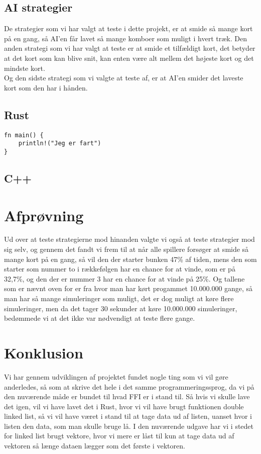 \documentclass[a4paper, 12pt]{article}
\begin{document}
\begin{multicols}{2}
\subsection{AI strategier}
De strategier som vi har valgt at teste i dette projekt, er at smide så mange kort på en gang, så AI'en får lavet så mange komboer som muligt i hvert træk. Den anden strategi som vi har valgt at teste er at smide et tilfældigt kort, det betyder at det kort som kan blive snit, kan enten være alt mellem det højeste kort og det mindste kort. \\
Og den sidste strategi som vi valgte at teste af, er at AI'en smider det laveste kort som den har i hånden. 






\vfill
\pagebreak


\subsection{Rust}


\begin{verbatim}
fn main() {
	println!("Jeg er fart")
}
\end{verbatim}


\subsection{C++}



\vfill
\pagebreak

\section{Afprøvning}
Ud over at teste strategierne mod hinanden valgte vi også at teste strategier mod sig selv, og gennem det fandt vi frem til at når alle spillere forsøger at smide så mange kort på en gang, så vil den der starter bunken 47\% af tiden, mens den som starter som nummer to i rækkefølgen har en chance for at vinde, som er på 32,7\%, og den der er nummer 3 har en chance for at vinde på 25\%. 
Og tallene som er nævnt oven for er fra hvor man har kørt progammet 10.000.000 gange, så man har så mange simuleringer som muligt, det er dog muligt at køre flere simuleringer, men da det tager 30 sekunder at køre 10.000.000 simuleringer, bedømmede vi at det ikke var nødvendigt at teste flere gange.

\section{Konklusion}
Vi har gennem udviklingen af projektet fundet nogle ting som vi vil gøre anderledes, så som at skrive det hele i det samme programmeringssprog, da vi på den nuværende måde er bundet til hvad FFI er i stand til. Så hvis vi skulle lave det igen, vil vi have lavet det i Rust, hvor vi vil have brugt funktionen double linked list, så vi vil have været i stand til at tage data ud af listen, uanset hvor i listen den data, som man skulle bruge lå. I den nuværende udgave har vi i stedet for linked list brugt vektore, hvor vi mere er låst til kun at tage data ud af vektoren så længe dataen lægger som det første i vektoren.

\bigbreak

\vfill
\pagebreak

\end{multicols}
\end{document}
